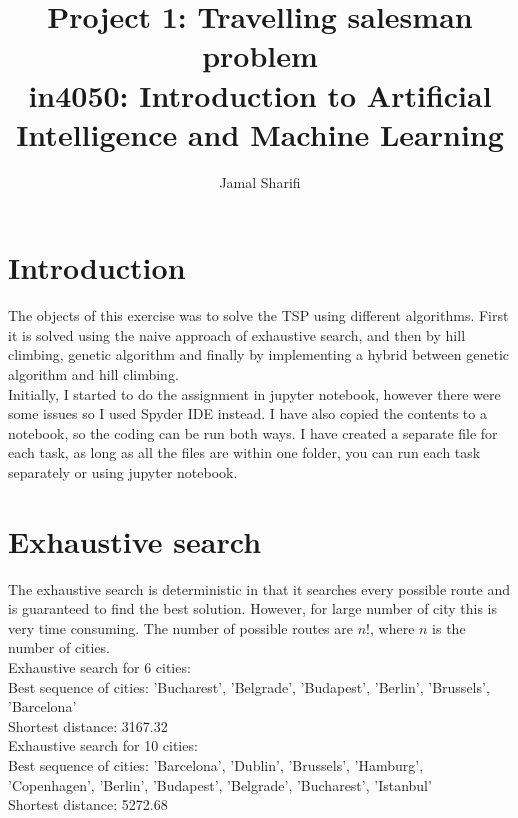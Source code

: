 \documentclass[a4paper,12pt]{article}
\title{{\sc Project 1: Travelling salesman problem \\ {\large in4050: Introduction to Artificial Intelligence and Machine Learning}}}
\author{Jamal Sharifi \\ }
\begin{document}
\linespread{1.5}
\renewcommand{\refname}{Referanser}
\renewcommand{\figurename}{Fig.} 

\onecolumn
\maketitle
\thispagestyle{empty}






\section{Introduction }
The objects of this exercise was to solve the TSP using different algorithms. First it is solved using the naive approach of exhaustive search, and then by hill climbing, genetic algorithm and finally by implementing a hybrid between genetic algorithm and hill climbing. \\

Initially, I started to do the assignment in jupyter notebook, however there were some issues so I used Spyder IDE instead. I have also copied the contents to a notebook, so the coding can be run both ways. I have created a separate file for each task, as long as all the files are within one folder, you can run each task separately or using jupyter notebook. 

\section{Exhaustive search }
The exhaustive search is deterministic in that it searches every possible route and is guaranteed to find the best solution. However, for large number of city this is very time consuming. The number of possible routes are $n!$, where $n$ is the number of cities. \\



Exhaustive search for 6 cities:\\
Best sequence of cities:  'Bucharest', 'Belgrade', 'Budapest', 'Berlin', 'Brussels', 'Barcelona'\\
Shortest distance:  3167.32\\

Exhaustive search for 10 cities:\\
Best sequence of cities:  'Barcelona', 'Dublin', 'Brussels', 'Hamburg', 'Copenhagen', 'Berlin', 'Budapest', 'Belgrade', 'Bucharest', 'Istanbul'\\
Shortest distance:  5272.68\\
\end{document}
